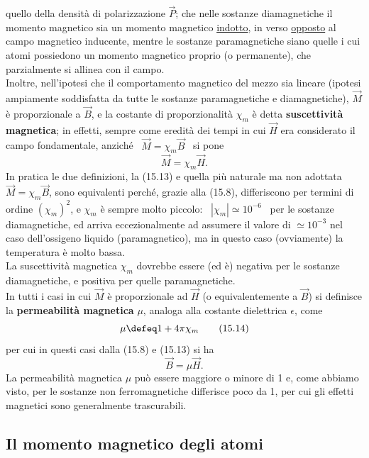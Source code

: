 quello della densit\`a di polarizzazione $\vec P$; che nelle sostanze
diamagnetiche il momento magnetico sia un momento magnetico \underline{indotto},
in verso \underline{opposto} al campo magnetico inducente, mentre le sostanze
paramagnetiche siano quelle i cui atomi possiedono un momento magnetico proprio
(o permanente), che parzialmente si allinea con il campo.\\
Inoltre, nell'ipotesi che il comportamento magnetico del mezzo sia lineare
(ipotesi ampiamente soddisfatta da tutte le sostanze paramagnetiche e
diamagnetiche), $\vec M$ \`e proporzionale a $\vec B$, e la costante di
proporzionalit\`a $\chi_m$ \`e detta \textbf{suscettivit\`a magnetica}; in
effetti, sempre come eredit\`a dei tempi in cui $\vec H$ era considerato il
campo fondamentale, anzich\'e \ $\vec M=\chi_m\vec B$ \ si pone
\begin{equation}
  \vec M=\chi_m\vec H.
  \tag{15.13}
\end{equation}
In pratica le due definizioni, la (15.13) e quella pi\`u naturale ma non
adottata \ $\vec M=\chi_m\vec B$, sono equivalenti perch\'e, grazie alla (15.8),
differiscono per termini di ordine $(\chi_m)^2$, e $\chi_m$ \`e sempre molto
piccolo: \ $|\chi_m|\simeq10^{-6}$ \ per le sostanze diamagnetiche, ed arriva
eccezionalmente ad assumere il valore di $\simeq10^{-3}$ nel caso dell'ossigeno
liquido (paramagnetico), ma in questo caso (ovviamente) la temperatura \`e molto
bassa.\\
La suscettivit\`a magnetica $\chi_m$ dovrebbe essere (ed \`e) negativa per le
sostanze diamagnetiche, e positiva per quelle paramagnetiche.\\
In tutti i casi in cui $\vec M$ \`e proporzionale ad $\vec H$ (o
equivalentemente a $\vec B$) si definisce la \textbf{permeabilit\`a magnetica}
$\mu$, analoga alla costante dielettrica $\epsilon$, come
\begin{equation}
  \mu\defeq1+4\pi\chi_m
  \tag{15.14}
\end{equation}
per cui in questi casi dalla (15.8) e (15.13) si ha
\begin{equation}
  \vec B=\mu\vec H.
  \tag{15.15}
\end{equation}
La permeabilit\`a magnetica $\mu$ pu\`o essere maggiore o minore di 1 e, come
abbiamo visto, per le sostanze non ferromagnetiche differisce poco da 1, per cui
gli effetti magnetici sono generalmente trascurabili.

\subsection{Il momento magnetico degli atomi}

